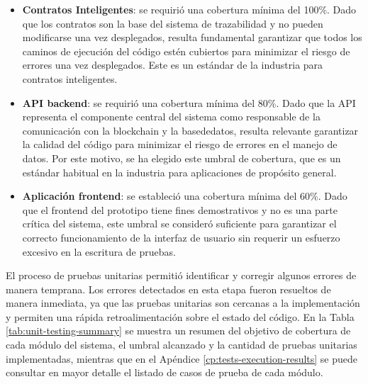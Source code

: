 \begin{itemize}
\item \textbf{Contratos Inteligentes}: se requirió una cobertura mínima del 100\%. Dado que los contratos son la base del sistema de trazabilidad y no pueden modificarse una vez desplegados, resulta fundamental garantizar que todos los caminos de ejecución del código estén cubiertos para minimizar el riesgo de errores una vez desplegados. Este es un estándar de la industria para contratos inteligentes.
\item \textbf{API \Gls{backend}}: se requirió una cobertura mínima del 80\%. Dado que la API representa el componente central del sistema como responsable de la comunicación con la \gls{blockchain} y la \gls{basededatos}, resulta relevante garantizar la calidad del código para minimizar el riesgo de errores en el manejo de datos. Por este motivo, se ha elegido este umbral de cobertura, que es un estándar habitual en la industria para aplicaciones de propósito general.
\item \textbf{Aplicación \Gls{frontend}}: se estableció una cobertura mínima del 60\%. Dado que el frontend del prototipo tiene fines demostrativos y no es una parte crítica del sistema, este umbral se consideró suficiente para garantizar el correcto funcionamiento de la interfaz de usuario sin requerir un esfuerzo excesivo en la escritura de pruebas.
\end{itemize}

El proceso de pruebas unitarias permitió identificar y corregir algunos errores de manera temprana. Los errores detectados en esta etapa fueron resueltos de manera inmediata, ya que las pruebas unitarias son cercanas a la implementación y permiten una rápida retroalimentación sobre el estado del código. En la Tabla \ref{tab:unit-testing-summary} se muestra un resumen del objetivo de cobertura de cada módulo del sistema, el umbral alcanzado y la cantidad de pruebas unitarias implementadas, mientras que en el Apéndice \ref{cp:tests-execution-results} se puede consultar en mayor detalle el listado de casos de prueba de cada módulo.

